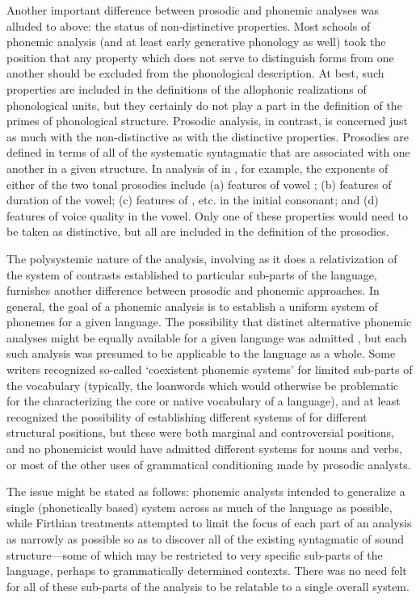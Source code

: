 Another important difference between prosodic and phonemic analyses
was alluded to above: the status of non-distinctive properties. Most
schools of phonemic analysis (and at least early generative phonology
as well) took the position that any property which does not serve to
distinguish forms from one another should be excluded from the
phonological description. At best, such properties are included in the
definitions of the allophonic realizations of phonological units, but
they certainly do not play a part in the definition of the primes of
phonological structure. Prosodic analysis, in {contrast}, is concerned
just as much with the non-distinctive as with the distinctive
properties. Prosodies are defined in terms of all of the systematic
syntagmatic  that are associated with one another in a
given structure. In  analysis of  in
, for example, the exponents of either of the two tonal
prosodies include (a) features of vowel ; (b) features of
duration of the vowel; (c) features of , etc. in the initial
consonant; and (d) features of voice quality in the vowel. Only one of
these properties would need to be taken as distinctive, but all are
included in the definition of the prosodies.

The polysystemic nature of the analysis, involving as it does a
relativization of the system of contrasts established to particular
sub-parts of the language, furnishes another difference between
prosodic and phonemic approaches. In general, the goal of a phonemic
analysis is to establish a uniform system of phonemes for a given
language. The possibility that distinct alternative phonemic analyses
might be equally available for a given language was admitted
\citep{chao34:non-uniqueness}, but each such analysis was presumed to
be applicable to the language as a whole. Some writers recognized
so-called `coexistent phonemic systems' for limited sub-parts of the
vocabulary (typically, the loanwords which would otherwise be
problematic for the  characterizing the core or native
vocabulary of a language), and at least \citet{twaddell35:on.defining}
recognized the possibility of establishing different systems of
 for different structural positions, but these were both
marginal and controversial positions, and no phonemicist would have
admitted different systems for nouns and verbs, or most of the other
uses of grammatical conditioning made by prosodic analysts.

The issue might be stated as follows: phonemic analysts intended to
generalize a single (phonetically based) system across as much of the
language as possible, while Firthian treatments attempted to limit the
focus of each part of an analysis as narrowly as possible so as to
discover all of the existing syntagmatic  of sound
structure—some of which may be restricted to very specific sub-parts of
the language, perhaps to grammatically determined contexts. There was
no need felt for all of these sub-parts of the analysis to be relatable
to a single overall system.

